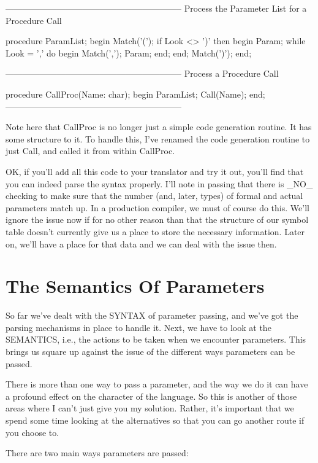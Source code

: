 \documentclass[float=false, crop=false]{standalone}
\begin{document}
{--------------------------------------------------------------}
{ Process the Parameter List for a Procedure  Call }

procedure ParamList;
begin
     Match('(');
     if Look <> ')' then begin
          Param;
          while Look = ',' do begin
               Match(',');
               Param;
          end;
     end;
     Match(')');
end;


{--------------------------------------------------------------}
{ Process a Procedure Call }

procedure CallProc(Name: char);
begin
     ParamList;
     Call(Name);
end;
{--------------------------------------------------------------}


Note here that CallProc is no longer just a simple code generation routine. It
has some structure to it. To handle this, I've renamed the code generation
routine to just Call, and called it from within CallProc.

OK, if you'll add all this code to your translator and try it out, you'll find
that you can indeed parse the syntax properly. I'll note in passing that there
is _NO_ checking to make sure that the number (and, later, types) of formal and
actual parameters match up. In a production compiler, we must of course do this.
We'll ignore the issue now if for no other reason than that the structure of our
symbol table doesn't currently give us a place to store the necessary
information. Later on, we'll have a place for that data and we can deal with the
issue then.


\section{The Semantics Of Parameters}

So far we've dealt with the SYNTAX of parameter passing, and we've got the
parsing mechanisms in place to handle it. Next, we have to look at the
SEMANTICS, i.e., the actions to be taken when we encounter parameters. This
brings us square up against the issue of the different ways parameters can be
passed.

There is more than one way to pass a parameter, and the way we do it can have a
profound effect on the character of the language. So this is another of those
areas where I can't just give you my solution. Rather, it's important that we
spend some time looking at the alternatives so that you can go another route if
you choose to.

There are two main ways parameters are passed:
\end{document}
